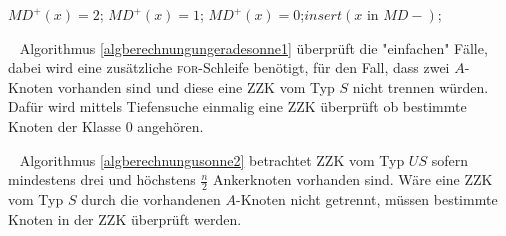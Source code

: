 \begin{algorithm}
\caption{$USU(x)$}
\begin{algorithmic}[1] 
\vspace{2mm}
 \STATE $MD^+(x)=2$; \STATE $MD^+(x)=1$; \STATE $MD^+(x)=0$;\STATE $insert(x \text{ in }  MD-)$;   \ENDIF \ENDIF
\end{algorithmic}
\label{algberechnungungeradesonne1}
\end{algorithm}
\vspace{-2mm}
~\linebreak 
Algorithmus \ref{algberechnungungeradesonne1} überprüft die "einfachen" Fälle, dabei wird eine zusätzliche \textsc{for}-Schleife benötigt, für den Fall, dass zwei $A$-Knoten vorhanden sind und diese eine ZZK vom Typ $S$ nicht trennen würden. Dafür wird mittels Tiefensuche einmalig eine ZZK überprüft ob bestimmte Knoten der Klasse $0$ angehören.\\
\vspace{-4mm}
\begin{algorithm}
\caption{$US(x)$}
\begin{algorithmic}[1]
\ENDIF
\end{algorithmic}
\label{algberechnungusonne2}
\end{algorithm}
\vspace{-4mm}
~\linebreak
Algorithmus \ref{algberechnungusonne2} betrachtet ZZK vom Typ $US$ sofern mindestens drei und höchstens $\frac{n}{2}$ Ankerknoten vorhanden sind. Wäre eine ZZK vom Typ $S$ durch die vorhandenen $A$-Knoten nicht getrennt, müssen bestimmte Knoten in der ZZK überprüft werden.\\
